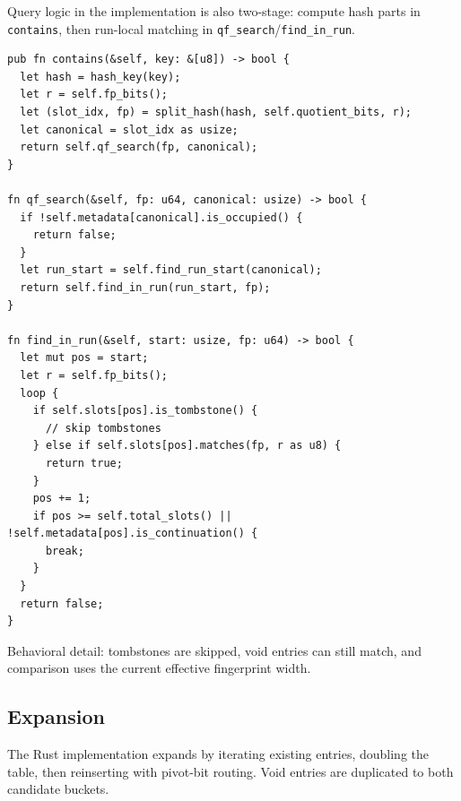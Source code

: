Query logic in the implementation is also two-stage: compute hash parts in \texttt{contains}, then run-local matching in \texttt{qf\_search}/\texttt{find\_in\_run}.

\begin{lstlisting}[caption={Query path in our Rust implementation}]
pub fn contains(&self, key: &[u8]) -> bool {
  let hash = hash_key(key);
  let r = self.fp_bits();
  let (slot_idx, fp) = split_hash(hash, self.quotient_bits, r);
  let canonical = slot_idx as usize;
  return self.qf_search(fp, canonical);
}

fn qf_search(&self, fp: u64, canonical: usize) -> bool {
  if !self.metadata[canonical].is_occupied() {
    return false;
  }
  let run_start = self.find_run_start(canonical);
  return self.find_in_run(run_start, fp);
}

fn find_in_run(&self, start: usize, fp: u64) -> bool {
  let mut pos = start;
  let r = self.fp_bits();
  loop {
    if self.slots[pos].is_tombstone() {
      // skip tombstones
    } else if self.slots[pos].matches(fp, r as u8) {
      return true;
    }
    pos += 1;
    if pos >= self.total_slots() || !self.metadata[pos].is_continuation() {
      break;
    }
  }
  return false;
}
\end{lstlisting}

Behavioral detail: tombstones are skipped, void entries can still match, and comparison uses the current effective fingerprint width.

\subsection{Expansion}

The Rust implementation expands by iterating existing entries, doubling the table, then reinserting with pivot-bit routing. Void entries are duplicated to both candidate buckets.

